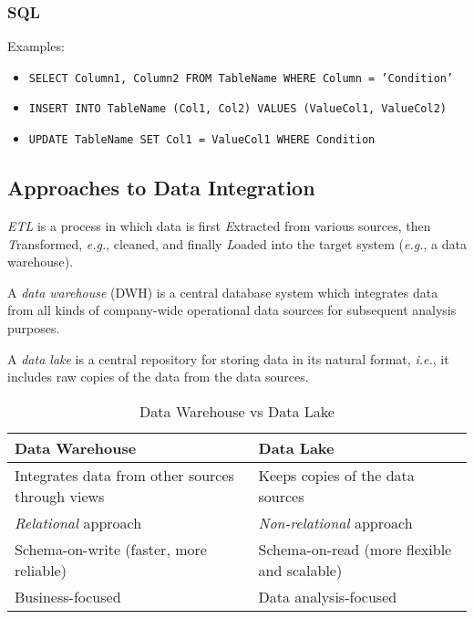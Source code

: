 \documentclass[a4paper]{report}
\begin{document}
\subsubsection*{SQL}

Examples:

\begin{itemize}
    \item \texttt{SELECT Column1, Column2 FROM TableName WHERE Column = 'Condition'}
    \item \texttt{INSERT INTO TableName (Col1, Col2) VALUES (ValueCol1, ValueCol2)}
    \item \texttt{UPDATE TableName SET Col1 = ValueCol1 WHERE Condition}
\end{itemize}

\subsection*{Approaches to Data Integration}

\begin{definition}
    \emph{ETL} is a process in which data is first \emph{E}xtracted from various sources, then \emph{T}ransformed, \emph{e.g.}, cleaned, and finally \emph{L}oaded into the target system (\emph{e.g.}, a data warehouse).
\end{definition}

\begin{definition}
    A \emph{data warehouse} (DWH) is a central database system which integrates data from all kinds of company-wide operational data sources for subsequent analysis purposes.
\end{definition}

\begin{definition}
    A \emph{data lake} is a central repository for storing data in its natural format, \emph{i.e.}, it includes raw copies of the data from the data sources.
\end{definition}

\begin{table}[H]
    \centering
    \caption{Data Warehouse vs Data Lake}
    \label{tab:warehouse-lake-comparison}
    \begin{tabular}{l l}
    \toprule
    Data Warehouse & Data Lake \\
    \midrule
    Integrates data from other sources through views  & Keeps copies of the data sources  \\
    \emph{Relational} approach & \emph{Non-relational} approach \\
    Schema-on-write (faster, more reliable) & Schema-on-read (more flexible and scalable) \\
    Business-focused & Data analysis-focused \\
    \bottomrule
    \end{tabular}
\end{table}
\end{document}
